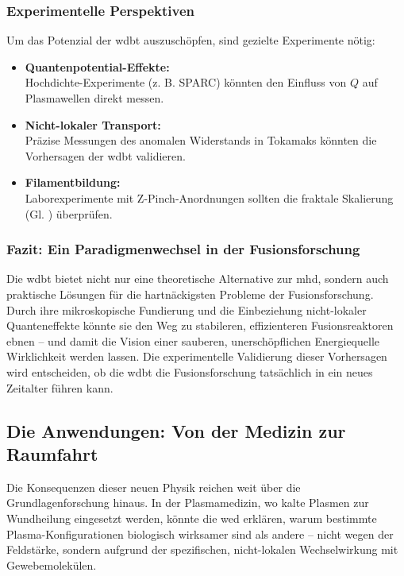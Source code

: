\subsubsection{Experimentelle Perspektiven}
Um das Potenzial der \gls{wdbt} auszuschöpfen, sind gezielte Experimente nötig:

\begin{itemize}
    \item \textbf{Quantenpotential-Effekte:}\\Hochdichte-Experimente (z. B. SPARC) könnten den Einfluss von $Q$ auf Plasmawellen direkt messen.
    \item \textbf{Nicht-lokaler Transport:}\\Präzise Messungen des anomalen Widerstands in Tokamaks könnten die Vorhersagen der \gls{wdbt} validieren.
    \item \textbf{Filamentbildung:}\\Laborexperimente mit Z-Pinch-Anordnungen sollten die fraktale Skalierung (Gl. ) überprüfen.
\end{itemize}

\subsubsection{Fazit: Ein Paradigmenwechsel in der Fusionsforschung}
Die \gls{wdbt} bietet nicht nur eine theoretische Alternative zur \gls{mhd}, sondern auch praktische Lösungen für die hartnäckigsten Probleme der Fusionsforschung. Durch ihre mikroskopische Fundierung
und die Einbeziehung nicht-lokaler Quanteneffekte könnte sie den Weg zu stabileren, effizienteren Fusionsreaktoren ebnen – und damit die Vision einer sauberen, unerschöpflichen Energiequelle
Wirklichkeit werden lassen. Die experimentelle Validierung dieser Vorhersagen wird entscheiden, ob die \gls{wdbt} die Fusionsforschung tatsächlich in ein neues Zeitalter führen kann.

\subsection{Die Anwendungen: Von der Medizin zur Raumfahrt}
Die Konsequenzen dieser neuen Physik reichen weit über die Grundlagenforschung hinaus. In der Plasmamedizin, wo kalte Plasmen zur Wundheilung eingesetzt werden, könnte die
\gls{wed} erklären, warum bestimmte Plasma-Konfigurationen biologisch wirksamer sind als andere – nicht wegen der Feldstärke, sondern aufgrund der spezifischen,
nicht-lokalen Wechselwirkung mit Gewebemolekülen.

